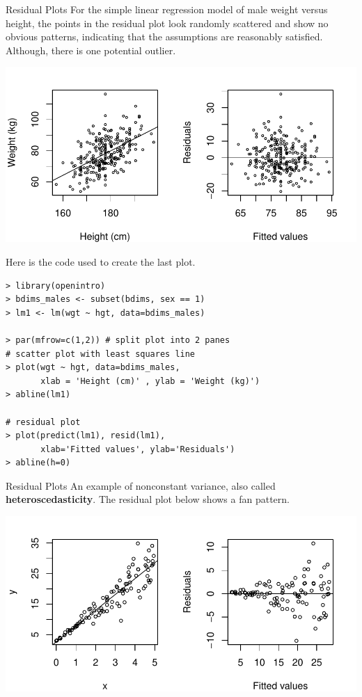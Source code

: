 \documentclass[10pt]{beamer}
\begin{document}
\begin{frame}[fragile]{Residual Plots}
For the simple linear regression model of male weight versus height, the points in the residual plot look randomly scattered and show no obvious patterns, indicating that the assumptions are reasonably satisfied.  Although, there is one potential outlier.

\centering
\includegraphics[scale=0.6]{figure/wgt_resid.pdf}
\end{frame}

\begin{frame}[fragile]
Here is the code used to create the last plot.
\small
\begin{verbatim}
> library(openintro)
> bdims_males <- subset(bdims, sex == 1) 
> lm1 <- lm(wgt ~ hgt, data=bdims_males)

> par(mfrow=c(1,2)) # split plot into 2 panes
# scatter plot with least squares line
> plot(wgt ~ hgt, data=bdims_males, 
       xlab = 'Height (cm)' , ylab = 'Weight (kg)')
> abline(lm1)

# residual plot
> plot(predict(lm1), resid(lm1), 
       xlab='Fitted values', ylab='Residuals')
> abline(h=0)
\end{verbatim}
\end{frame}

\begin{frame}{Residual Plots}
An example of nonconstant variance, also called \textbf{heteroscedasticity}.  The residual plot below shows a fan pattern.

\centering
\includegraphics[scale=0.6]{figure/resid_var.pdf}
\end{frame}
\end{document}
